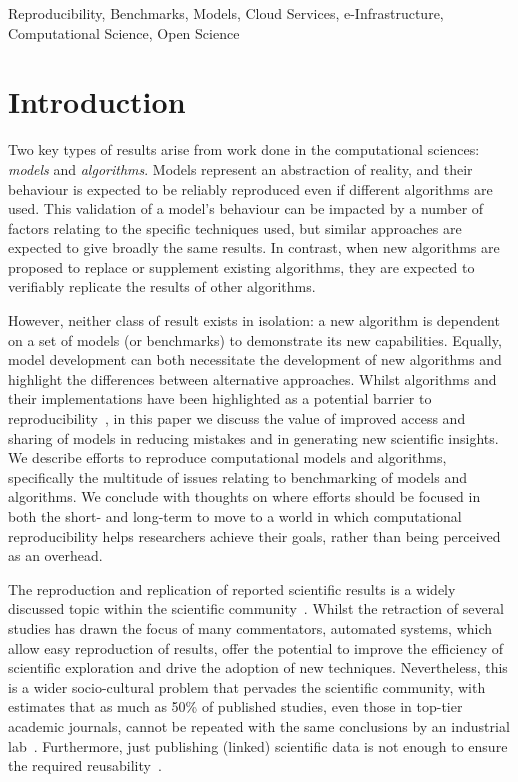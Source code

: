 \documentclass[conference]{IEEEtran}
\begin{document}
\begin{IEEEkeywords}
Reproducibility, Benchmarks, Models, Cloud Services, e-Infrastructure,
Computational Science, Open Science
\end{IEEEkeywords}

\IEEEpeerreviewmaketitle

\section{Introduction}

Two key types of results arise from work done in the computational
sciences: {\emph{models}} and {\emph{algorithms}}. Models represent an
abstraction of reality, and their behaviour is expected to be reliably
reproduced even if different algorithms are used. This validation of a
model's behaviour can be impacted by a number of factors relating to
the specific techniques used, but similar approaches are expected to
give broadly the same results.  In contrast, when new algorithms are
proposed to replace or supplement existing algorithms, they are
expected to verifiably replicate the results of other algorithms.

However, neither class of result exists in isolation: a new algorithm
is dependent on a set of models (or benchmarks) to demonstrate its new
capabilities. Equally, model development can both necessitate the
development of new algorithms and highlight the differences between
alternative approaches. Whilst algorithms and their implementations
have been highlighted as a potential barrier to
reproducibility~\cite{crick-et-al_wssspe2}, in this paper we discuss
the value of improved access and sharing of models in reducing
mistakes and in generating new scientific insights. We describe
efforts to reproduce computational models and algorithms, specifically
the multitude of issues relating to benchmarking of models and
algorithms.  We conclude with thoughts on where efforts should be
focused in both the short- and long-term to move to a world in which
computational reproducibility helps researchers achieve their goals,
rather than being perceived as an overhead.

The reproduction and replication of reported scientific results is a
widely discussed topic within the scientific
community~\cite{barnes:2010,morin-et-al:2012,joppa-et-al:2013}.
Whilst the retraction of several studies has drawn the focus of many
commentators, automated systems, which allow easy reproduction of
results, offer the potential to improve the efficiency of scientific
exploration and drive the adoption of new techniques. Nevertheless,
this is a wider socio-cultural problem that pervades the scientific
community, with estimates that as much as 50\% of published studies,
even those in top-tier academic journals, cannot be repeated with the
same conclusions by an industrial
lab~\cite{osherovich:2011}. Furthermore, just publishing (linked)
scientific data is not enough to ensure the required
reusability~\cite{bechhofer-et-al:2013}.
\end{document}
